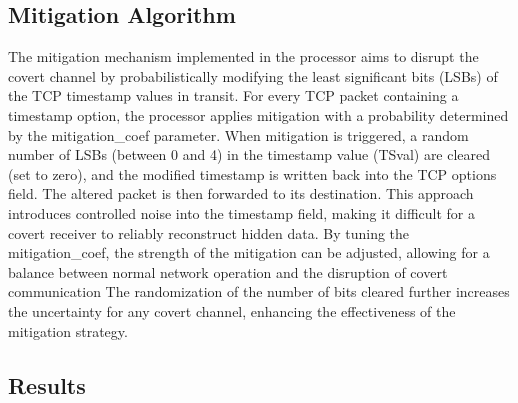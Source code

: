 \documentclass[10pt,a4paper]{article}
\begin{document}
\subsection*{Mitigation Algorithm}

The mitigation mechanism implemented in the processor aims to disrupt the covert channel by probabilistically modifying the least significant bits (LSBs) of the TCP timestamp values in transit.
 For every TCP packet containing a timestamp option, the processor applies mitigation with a probability determined by the mitigation\_coef parameter.
  When mitigation is triggered, a random number of LSBs (between 0 and 4) in the timestamp value (TSval) are cleared (set to zero), and the modified timestamp is written back into the TCP options field. 
  The altered packet is then forwarded to its destination. This approach introduces controlled noise into the timestamp field, making it difficult for a covert receiver to reliably reconstruct hidden data. 
  By tuning the mitigation\_coef, the strength of the mitigation can be adjusted, allowing for a balance between normal network operation and the disruption of covert communication
  The randomization of the number of bits cleared further increases the uncertainty for any covert channel, enhancing the effectiveness of the mitigation strategy.

\subsection*{Results}
\end{document}
